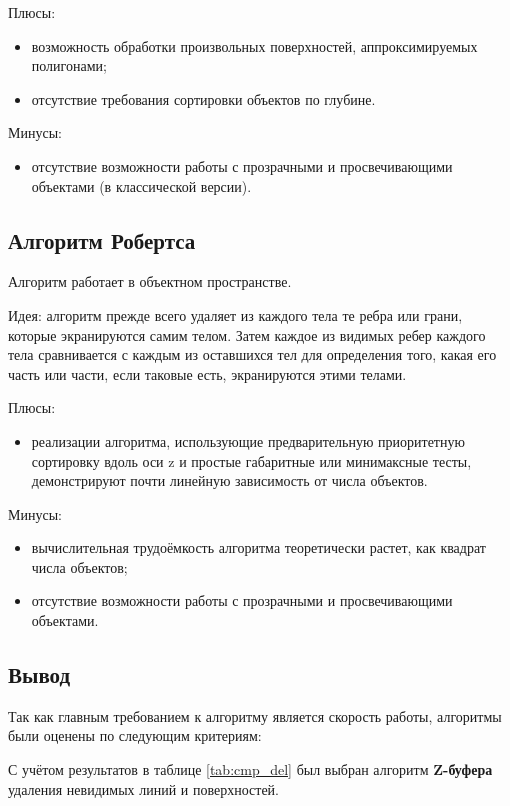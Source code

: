 Плюсы:
\begin{itemize}
    \item возможность обработки произвольных поверхностей, аппроксимируемых
        полигонами;
    \item отсутствие требования сортировки объектов по глубине.
\end{itemize}

Минусы:
\begin{itemize}
    \item отсутствие возможности работы с прозрачными и просвечивающими
        объектами (в классической версии).
\end{itemize}

\subsection{Алгоритм Робертса}
Алгоритм работает в объектном пространстве\cite{robert}.

Идея: алгоритм прежде всего удаляет из каждого тела те ребра или грани, которые
экранируются самим телом. Затем каждое из видимых ребер каждого тела
сравнивается с каждым из оставшихся тел для определения того, какая его часть
или части, если таковые есть, экранируются этими телами.

Плюсы:
\begin{itemize}
    \item реализации алгоритма, использующие предварительную приоритетную
        сортировку вдоль оси z и простые габаритные или минимаксные тесты,
        демонстрируют почти линейную зависимость от числа
        объектов\cite{robert}.
\end{itemize}

Минусы:
\begin{itemize}
    \item вычислительная трудоёмкость алгоритма теоретически растет, как
        квадрат числа объектов\cite{robert};
    \item отсутствие возможности работы с прозрачными и просвечивающими
        объектами.
\end{itemize}

\subsection*{Вывод}

Так как главным требованием к алгоритму является скорость работы, алгоритмы
были оценены по следующим критериям:

С учётом результатов в таблице \ref{tab:cmp_del} был выбран алгоритм
\textbf{Z-буфера} удаления невидимых линий и поверхностей.


